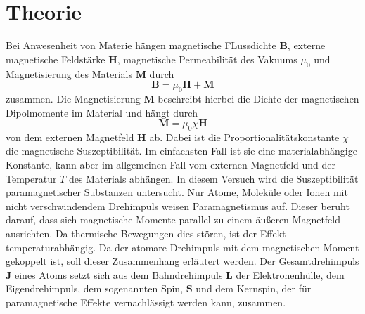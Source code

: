 \section{Theorie}
\label{sec:Theorie}
Bei Anwesenheit von Materie hängen magnetische FLussdichte $\symbf{B}$, externe
magnetische Feldstärke $\symbf{H}$, magnetische Permeabilität des Vakuums $\mu_0$
und Magnetisierung des Materials $\symbf{M}$ durch
\begin{equation}
  \symbf{B} = \mu_0 \symbf{H} + \symbf{M}
  \label{eqn:bhm}
\end{equation}
zusammen. Die Magnetisierung $\symbf{M}$ beschreibt hierbei die Dichte der
magnetischen Dipolmomente im Material und hängt durch
\begin{equation}
  \symbf{M} = \mu_0 \chi \symbf{H}
\end{equation}
von dem externen Magnetfeld $\symbf{H}$ ab. Dabei ist die Proportionalitätskonstante
$\chi$ die magnetische Suszeptibilität. Im einfachsten Fall ist sie eine materialabhängige
Konstante, kann aber im allgemeinen Fall vom externen Magnetfeld und der Temperatur $T$
des Materials abhängen.
In diesem Versuch wird die Suszeptibilität paramagnetischer Substanzen untersucht.
Nur Atome, Moleküle oder Ionen mit nicht verschwindendem Drehimpuls weisen
Paramagnetismus auf. Dieser beruht darauf, dass sich magnetische Momente parallel zu
einem äußeren Magnetfeld ausrichten. Da thermische Bewegungen dies stören, ist der Effekt
temperaturabhängig. Da der atomare Drehimpuls mit dem magnetischen Moment gekoppelt ist,
soll dieser Zusammenhang erläutert werden.
Der Gesamtdrehimpuls $\symbf{J}$ eines Atoms setzt sich aus dem Bahndrehimpuls
$\symbf{L}$ der Elektronenhülle, dem Eigendrehimpuls, dem sogenannten Spin, $\symbf{S}$
und dem Kernspin, der für paramagnetische Effekte vernachlässigt werden kann, zusammen.
